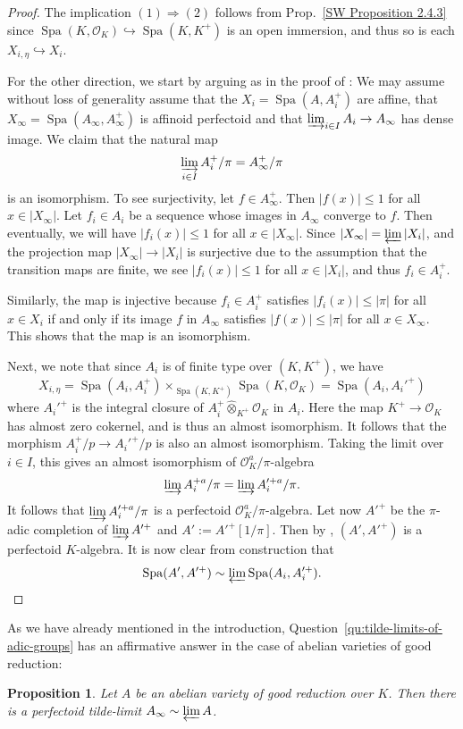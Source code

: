 \documentclass[10pt,oneside]{amsart}
\newtheorem{proposition}[theorem]{Proposition}
\theoremstyle{definition}
\newcommand{\Spa}{\operatorname{Spa}}
\newcommand{\hotimes}{\hat{\otimes}}
\begin{document}
\begin{proof}
	The implication $(1)\Rightarrow (2)$ follows from Prop.~\ref{SW Proposition 2.4.3} since $\Spa(K,\mathcal O_K)\hookrightarrow \Spa(K,K^+)$ is an open immersion, and thus so is each $X_{i,\eta}\hookrightarrow X_i$.
	
	For the other direction, we start by arguing as in the proof of \cite[Prop. 2.4.5]{SW}: We may assume without loss of generality assume that the $X_i=\Spa(A,A_i^+)$ are affine, that $X_\infty=\Spa(A_\infty,A_\infty^+)$ is affinoid perfectoid and that $\varinjlim_{i\in I} A_i\to A_\infty$ has dense image. We claim that the natural map
	\[\varinjlim_{i\in I}A_i^+/\pi= A_\infty^{+}/\pi\]
	is an isomorphism. To see surjectivity, let $f\in A_\infty^+$. Then $|f(x)|\leq 1$ for all $x\in |X_\infty|$. Let $f_i\in A_i$ be a sequence whose images in $A_\infty$ converge to $f$. Then eventually, we will have $|f_i(x)|\leq 1$ for all  $x\in |X_\infty|$. Since $|X_\infty|=\varprojlim |X_i|$, and the projection map $|X_\infty|\to |X_i|$ is surjective due to the assumption that the transition maps are finite, we see $|f_i(x)|\leq 1$ for all $x\in |X_i|$, and thus $f_i\in A_i^+$.
	
	Similarly, the map is injective because $f_i\in A_i^+$ satisfies $|f_i(x)|\leq |\pi|$ for all $x\in X_i$ if and only if its image $f$ in $A_\infty$ satisfies $|f(x)|\leq |\pi|$ for all $x\in X_\infty$. This shows that the map is an isomorphism.
	
	
	Next, we note that since $A_i$ is of finite type over $(K,K^+)$, we have \[X_{i,\eta}=\Spa(A_i,A_i^+)\times_{\Spa(K,K^+)}\Spa(K,\mathcal O_K)=\Spa(A_i,A_i'^+)\]
	where $A_i'^+$ is the integral closure of $A_i^+\hotimes_{K^+}\mathcal O_K$ in $A_i$. Here the map $K^+\to \mathcal O_K$ has almost zero cokernel, and is thus an almost isomorphism. It follows that the morphism $A_i^+/p\to A_i'^+/p$ is also an almost isomorphism. Taking the limit over $i\in I$, this gives an almost isomorphism of $\mathcal O_K^a/\pi$-algebra
	\[\varinjlim A_i^{+a}/\pi=\varinjlim A'^{+a}_i/\pi.\]
	It follows that $\varinjlim A'^{+a}_i/\pi$ is a perfectoid $\mathcal O_K^a/\pi$-algebra. Let now $A'^{+}$ be the $\pi$-adic completion of $\varinjlim A'^+$ and $A':=A'^{+}[1/\pi]$. Then by \cite[Thm. 5.2]{perfectoid}, $(A',A'^+)$ is a perfectoid $K$-algebra. It is now clear from construction that 
	\[\Spa(A',A'^+)\sim \varprojlim\Spa(A_i,A_i'^+).\qedhere\]
\end{proof}
\fi
		
As we have already mentioned in the introduction, Question~\ref{qu:tilde-limits-of-adic-groups} has an affirmative answer in the case of abelian varieties of good reduction: 
\begin{proposition}\label{tilde-limit exists and is perfectoid in the good reduction case}
		Let $A$ be an abelian variety of good reduction over $K$. Then there is a perfectoid tilde-limit $A_\infty\sim \varprojlim A$.
	\end{proposition}
	 	
\end{document}
